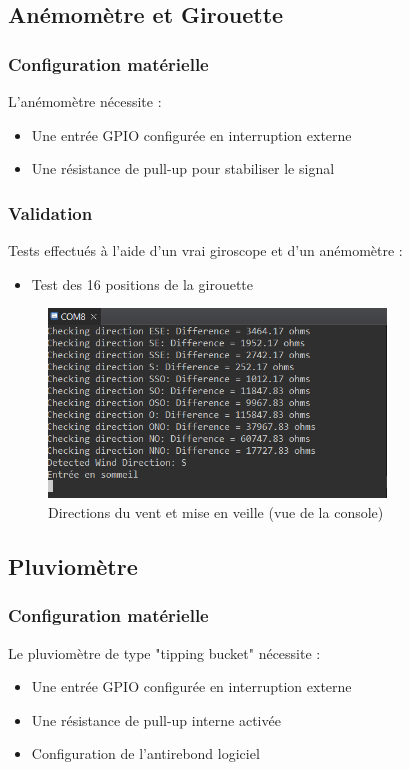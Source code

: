 \documentclass[12pt]{article}
\begin{document}
\subsection{Anémomètre et Girouette}
\subsubsection{Configuration matérielle}
L'anémomètre nécessite :
\begin{itemize}
    \item Une entrée GPIO configurée en interruption externe
    \item Une résistance de pull-up pour stabiliser le signal
\end{itemize}

\subsubsection{Validation}
Tests effectués à l'aide d'un vrai giroscope et d'un anémomètre :
\begin{itemize}
    \item Test des 16 positions de la girouette
\end{itemize}

\begin{figure}[H]
    \capstart
    \centering
    \includegraphics[width=0.8\textwidth]{./images/console_direction_du_vent_et_miseenveille.png}
    \caption{Directions du vent et mise en veille (vue de la console)} 
    \label{fig:girouette_positions}
\end{figure}

\subsection{Pluviomètre}
\subsubsection{Configuration matérielle}
Le pluviomètre de type "tipping bucket" nécessite :
\begin{itemize}
    \item Une entrée GPIO configurée en interruption externe
    \item Une résistance de pull-up interne activée
    \item Configuration de l'antirebond logiciel
\end{itemize}
\end{document}
